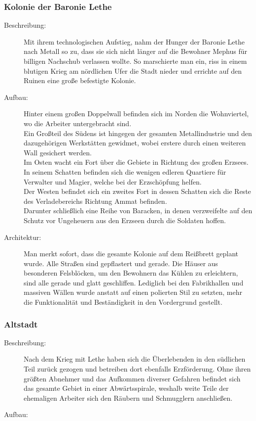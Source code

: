 \documentclass[a4paper,12pt,oneside]{book}
\begin{document}
\subsubsection{Kolonie der Baronie Lethe}
\begin{description}
\item[Beschreibung:]Mit ihrem technologischen Aufstieg, nahm der Hunger der Baronie Lethe nach Metall so zu, dass sie sich nicht länger auf die Bewohner Mephus für billigen Nachschub verlassen wollte. So marschierte man ein, riss in einem blutigen Krieg am nördlichen Ufer die Stadt nieder und errichte auf den Ruinen eine große befestigte Kolonie.
\item[Aufbau:]Hinter einem großen Doppelwall befinden sich im Norden die Wohnviertel, wo die Arbeiter untergebracht sind.
\\Ein Großteil des Südens ist hingegen der gesamten Metallindustrie und den dazugehörigen Werkstätten gewidmet, wobei erstere durch einen weiteren Wall gesichert werden.
\\Im Osten wacht ein Fort über die Gebiete in Richtung des großen Erzsees. In seinem Schatten befinden sich die wenigen edleren Quartiere für Verwalter und Magier, welche bei der Erzschöpfung helfen.
\\Der Westen befindet sich ein zweites Fort in dessen Schatten sich die Reste des Verladebereichs Richtung Ammat befinden.
\\Darunter schließlich eine Reihe von Baracken, in denen verzweifelte auf den Schutz vor Ungeheuern aus den Erzseen durch die Soldaten hoffen.
\item[Architektur:]Man merkt sofort, dass die gesamte Kolonie auf dem Reißbrett geplant wurde. Alle Straßen sind gepflastert und gerade. Die Häuser aus besonderen Felsblöcken, um den Bewohnern das Kühlen zu erleichtern, sind alle gerade und glatt geschliffen. Lediglich bei den Fabrikhallen und massiven Wällen wurde anstatt auf einen polierten Stil zu setzten, mehr die Funktionalität und Beständigkeit in den Vordergrund gestellt.
\end{description}

\subsubsection{Altstadt}
\begin{description}
\item[Beschreibung:]Nach dem Krieg mit Lethe haben sich die Überlebenden in den südlichen Teil zurück gezogen und betreiben dort ebenfalls Erzförderung. Ohne ihren größten Abnehmer und das Aufkommen diverser Gefahren befindet sich das gesamte Gebiet in einer Abwärtsspirale, weshalb weite Teile der ehemaligen Arbeiter sich den Räubern und Schmugglern anschließen.
\item[Aufbau:]
\end{description}
\end{document}
